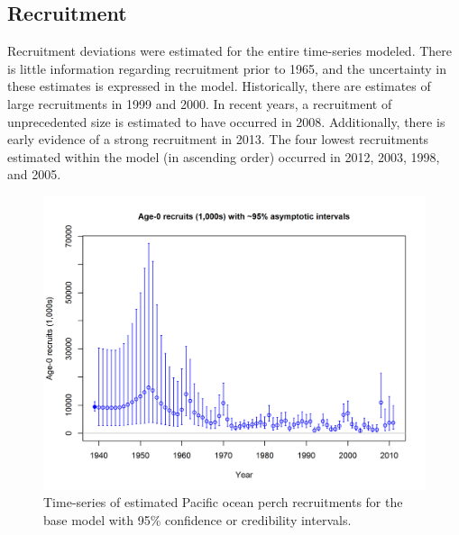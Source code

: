 \documentclass[12pt,]{article}
\begin{document}
\FloatBarrier

\subsection*{Recruitment}\label{recruitment}

Recruitment deviations were estimated for the entire time-series
modeled. There is little information regarding recruitment prior to
1965, and the uncertainty in these estimates is expressed in the model.
Historically, there are estimates of large recruitments in 1999 and
2000. In recent years, a recruitment of unprecedented size is estimated
to have occurred in 2008. Additionally, there is early evidence of a
strong recruitment in 2013. The four lowest recruitments estimated
within the model (in ascending order) occurred in 2012, 2003, 1998, and
2005.

\begin{figure}
\centering
\includegraphics{r4ss/plots_mod1/ts11_Age-0_recruits_(1000s)_with_95_asymptotic_intervals.png}
\caption{Time-series of estimated Pacific ocean perch recruitments for
the base model with 95\% confidence or credibility intervals.
\label{fig:Recruits_all}}
\end{figure}
\end{document}
